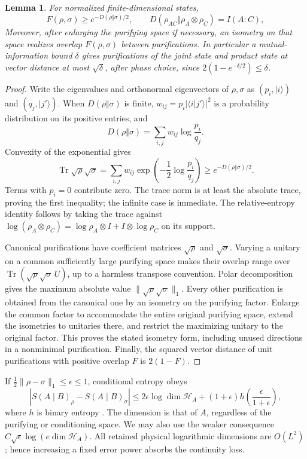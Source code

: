 \documentclass[11pt]{article}
\numberwithin{equation}{section}
\newtheorem{lemma}[theorem]{Lemma}
\theoremstyle{definition}
\theoremstyle{remark}
\begin{document}
\begin{lemma}\label{lem:fidelity}
For normalized finite-dimensional states,
\begin{equation}\label{eq:fidelity-information}
 F(\rho,\sigma)\ge e^{-D(\rho\Vert\sigma)/2},
 \qquad
 D(\rho_{AC}\Vert\rho_A\otimes\rho_C)=I(A:C),
\end{equation}
Moreover, after enlarging the
purifying space if necessary, an isometry on that space realizes overlap
$F(\rho,\sigma)$ between purifications. In particular a
mutual-information bound $\delta$ gives purifications of the joint state
and product state at vector distance at most $\sqrt\delta$, after phase
choice, since $2(1-e^{-\delta/2})\le\delta$.
\end{lemma}
\begin{proof}
Write the eigenvalues and orthonormal eigenvectors of $\rho,\sigma$ as
$(p_i,|i\rangle)$ and $(q_j,|j'\rangle)$. When $D(\rho\Vert\sigma)$ is
finite, $w_{ij}=p_i|\langle i|j'\rangle|^2$ is a probability distribution
on its positive entries, and
\[
 D(\rho\Vert\sigma)=\sum_{i,j}w_{ij}\log\frac{p_i}{q_j}.
\]
Convexity of the exponential gives
\[
 \operatorname{Tr}\sqrt\rho\sqrt\sigma
 =\sum_{i,j}w_{ij}\exp\!\left(-\frac12\log\frac{p_i}{q_j}\right)
 \ge e^{-D(\rho\Vert\sigma)/2}.
\]
Terms with $p_i=0$ contribute zero. The trace norm is at least the
absolute trace, proving the first inequality; the infinite case is
immediate. The relative-entropy identity follows by taking the trace
against $\log(\rho_A\otimes\rho_C)
=\log\rho_A\otimes I+I\otimes\log\rho_C$ on its support.

Canonical purifications have coefficient matrices $\sqrt\rho$ and
$\sqrt\sigma$. Varying a unitary on a common sufficiently large
purifying space makes their overlap range over
$\operatorname{Tr}(\sqrt\rho\sqrt\sigma\,U)$, up to a harmless transpose convention.
Polar decomposition gives the maximum absolute value
$\lVert \sqrt\rho\sqrt\sigma\rVert_1$. Every other purification is obtained
from the canonical one by an isometry on the purifying factor. Enlarge
the common factor to accommodate the entire original purifying space,
extend the isometries to unitaries there, and restrict the maximizing
unitary to the original factor. This proves the stated isometry form,
including unused directions in a nonminimal purification. Finally,
the squared vector distance of unit purifications with positive overlap
$F$ is $2(1-F)$.
\end{proof}

If $\frac12\lVert \rho-\sigma\rVert_1\le\epsilon\le1$, conditional entropy
obeys
\begin{equation}\label{eq:entropy-continuity}
 |S(A\mid B)_\rho-S(A\mid B)_\sigma|
 \le2\epsilon\log\dim\mathcal H_A
 +(1+\epsilon)h\!\left(\frac{\epsilon}{1+\epsilon}\right),
\end{equation}
where $h$ is binary entropy \cite[Lemma~2]{Winter2016}. The dimension is
that of $A$, regardless of the purifying or conditioning space. We may
also use the weaker consequence $C\sqrt\epsilon\log(e\dim\mathcal H_A)$.
All retained physical logarithmic dimensions are $O(L^2)$; hence increasing
a fixed error power absorbs the continuity loss.
\end{document}
